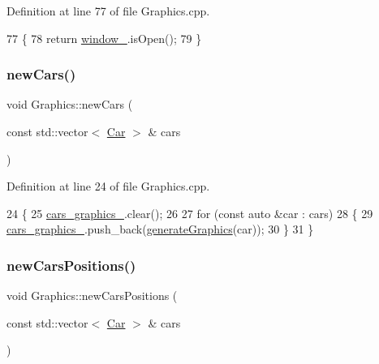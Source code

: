 Definition at line 77 of file Graphics.\+cpp.


\begin{DoxyCode}
77                                         \{
78     \textcolor{keywordflow}{return} \hyperlink{classGraphics_ac760fe1abb0b648844c9f15afa087ef6}{window\_}.isOpen();
79 \}
\end{DoxyCode}
\mbox{\label{classGraphics_aee9384443642037cef28b28acddf86d3}} 
\subsubsection{\texorpdfstring{new\+Cars()}{newCars()}}
{\footnotesize\ttfamily void Graphics\+::new\+Cars (\begin{DoxyParamCaption}\item[{const std\+::vector$<$ \hyperlink{classCar}{Car} $>$ \&}]{cars }\end{DoxyParamCaption})}



Definition at line 24 of file Graphics.\+cpp.


\begin{DoxyCode}
24                                                  \{
25     \hyperlink{classGraphics_a8be356ffe3ee47f915027361b6ae34ab}{cars\_graphics\_}.clear();
26 
27     \textcolor{keywordflow}{for} (\textcolor{keyword}{const} \textcolor{keyword}{auto} &car : cars)
28     \{
29         \hyperlink{classGraphics_a8be356ffe3ee47f915027361b6ae34ab}{cars\_graphics\_}.push\_back(\hyperlink{classGraphics_a504c1b9aa359dbe8b05f8879c1045610}{generateGraphics}(car));
30     \}
31 \}
\end{DoxyCode}
\mbox{\label{classGraphics_a5f2e6a6cc8dffc34b48e66df42046243}} 
\subsubsection{\texorpdfstring{new\+Cars\+Positions()}{newCarsPositions()}}
{\footnotesize\ttfamily void Graphics\+::new\+Cars\+Positions (\begin{DoxyParamCaption}\item[{const std\+::vector$<$ \hyperlink{classCar}{Car} $>$ \&}]{cars }\end{DoxyParamCaption})}



